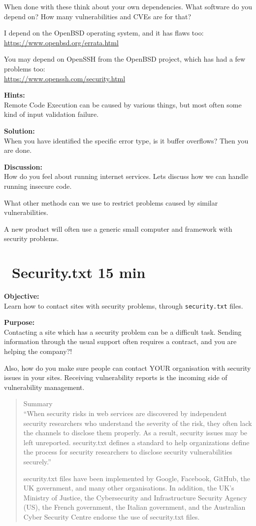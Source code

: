 \documentclass[a4paper,11pt,notitlepage]{report}
\begin{document}
When done with these think about your own dependencies. What software do you depend on? How many vulnerabilities and CVEs are for that?

I depend on the OpenBSD operating system, and it has flaws too:\\
\url{https://www.openbsd.org/errata.html}

You may depend on OpenSSH from the OpenBSD project, which has had a few problems too:\\
\url{https://www.openssh.com/security.html}

{\bf Hints:}\\
Remote Code Execution can be caused by various things, but most often some kind of input validation failure.

{\bf Solution:}\\
When you have identified the specific error type, is it buffer overflows? Then you are done.

{\bf Discussion:}\\
How do you feel about running internet services. Lets discuss how we can handle running insecure code.

What other methods can we use to restrict problems caused by similar vulnerabilities.

A new product will often use a generic small computer and framework with security problems.


\chapter{\faInfoCircle\ Security.txt 15 min}
\label{ex:security.txt}

{\bf Objective:}\\
Learn how to contact sites with security problems, through \verb+security.txt+ files.

{\bf Purpose:}\\
Contacting a site which has a security problem can be a difficult task. Sending information through the usual support often requires a contract, and you are helping the company?!

Also, how do you make sure people can contact YOUR organisation with security issues in your sites. Receiving vulnerability reports is the incoming side of vulnerability management.

\begin{quote}\footnotesize
Summary\\
“When security risks in web services are discovered by independent security researchers who understand the severity of the risk, they often lack the channels to disclose them properly. As a result, security issues may be left unreported. security.txt defines a standard to help organizations define the process for security researchers to disclose security vulnerabilities securely.”

security.txt files have been implemented by Google, Facebook, GitHub, the UK government, and many other organisations. In addition, the UK’s Ministry of Justice, the Cybersecurity and Infrastructure Security Agency (US), the French government, the Italian government, and the Australian Cyber Security Centre endorse the use of security.txt files.
\end{quote}
\end{document}
